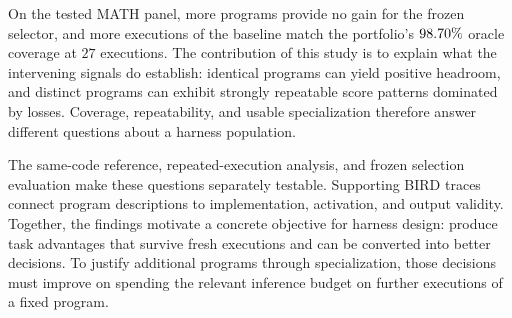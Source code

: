 On the tested MATH panel, more programs provide no gain for the frozen
selector, and more executions of the baseline match the portfolio's
$98.70\%$ oracle coverage at $27$ executions.
The contribution of this study is to explain what the intervening
signals do establish: identical programs can yield positive headroom,
and distinct programs can exhibit strongly repeatable score patterns
dominated by losses. Coverage, repeatability, and usable specialization
therefore answer different questions about a harness population.

The same-code reference, repeated-execution analysis, and frozen
selection evaluation make these questions separately testable.
Supporting BIRD traces connect program descriptions to implementation,
activation, and output validity. Together, the findings motivate a
concrete objective for harness design: produce task advantages that
survive fresh executions and can be converted into better decisions.
To justify additional programs through specialization, those decisions
must improve on spending the relevant inference budget on further
executions of a fixed program.
